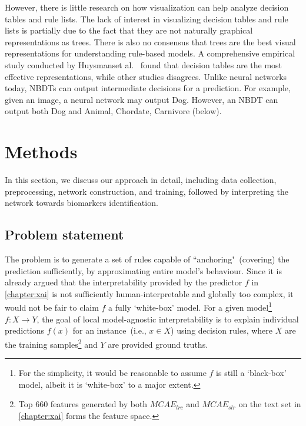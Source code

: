 \hspace*{3.5mm} However, there is little research on how visualization can help analyze decision tables and rule lists. The lack of interest in visualizing decision tables and rule lists is partially due to the fact that they are not naturally graphical representations as trees. There is also no consensus that trees are the best visual representations for understanding rule-based models. A comprehensive empirical study conducted by Huysmanset al.~\cite{mehrabi2019survey} found that decision tables are the most effective representations, while other studies disagrees. 
Unlike neural networks today, NBDTs can output intermediate decisions for a prediction. For example, given an image, a neural network may output Dog. However, an NBDT can output both Dog and Animal, Chordate, Carnivore (below).

\section{Methods} \label{chapter_7:mm}
In this section, we discuss our approach in detail, including data collection, preprocessing, network construction, and training, followed by interpreting the network towards biomarkers identification. 

\subsection{Problem statement}
The problem is to generate a set of rules capable of ``anchoring"~(covering) the prediction sufficiently, by approximating entire model's behaviour. Since it is already argued that the interpretability provided by the predictor ${f}$ in \cref{chapter:xai} is not sufficiently human-interpretable and globally too complex, it would not be fair to claim ${f}$ a fully `white-box' model. For a given model\footnote{For the simplicity, it would be reasonable to assume ${f}$ is  still a `black-box' model, albeit it is `white-box' to a major extent.} ${f}: X \rightarrow Y$, the goal of local model-agnostic interpretability is to explain individual predictions ${f}(x)$ for an instance~(i.e., $x \in X$) using decision rules, where $X$ are the training samples\footnote{Top 660 features generated by both $MCAE_{lrc}$ and $MCAE_{slr}$ on the text set in \cref{chapter:xai} forms the feature space.} and $Y$ are provided ground truths. %

